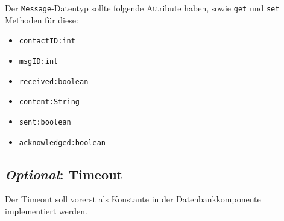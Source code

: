 \documentclass[a4paper]{article}
\begin{document}
    Der \texttt{Message}-Datentyp sollte folgende Attribute haben, sowie \texttt{get} und \texttt{set} Methoden für diese:
    \begin{itemize}
        \item
            \texttt{contactID:int}
        \item
            \texttt{msgID:int}
        \item
            \texttt{received:boolean}
        \item
            \texttt{content:String}
        \item
            \texttt{sent:boolean}
        \item
            \texttt{acknowledged:boolean}
    \end{itemize}

    \subsection{\textit{Optional}: Timeout}

    Der Timeout soll vorerst als Konstante in der Datenbankkomponente implementiert werden.
\end{document}
